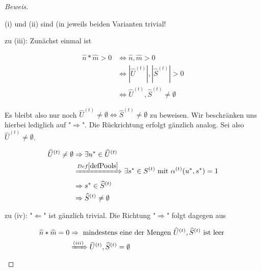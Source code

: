 \begin{proof}[Beweis] \textrm{ }

\vspace{0.3cm}

(i) und (ii) sind (in jeweils beiden Varianten trivial!

\vspace{0.3cm}

zu (iii): Zunächst einmal ist

\begin{align*}
\widehat{n} * \widehat{m} > 0 &\Leftrightarrow \widehat{n}, \widehat{m} > 0 \\
&\Leftrightarrow |\widehat{U}^{(t)}|, |\widehat{S}^{(t)}| > 0 \\
&\Leftrightarrow \widehat{U}^{(t)}, \widehat{S}^{(t)} \neq \emptyset
\end{align*}

\vspace{0.3cm}

Es bleibt also nur noch $\widehat{U}^{(t)} \neq \emptyset \Leftrightarrow \widehat{S}^{(t)} \neq \emptyset$ zu beweisen. Wir beschränken uns hierbei lediglich auf "$\Rightarrow$". Die Rückrichtung erfolgt gänzlich analog. Sei also $\widehat{U}^{(t)} \neq \emptyset$.

\begin{align*}
\widehat{U}^{(t)} \neq \emptyset &\Rightarrow \exists u^{*} \in \widehat{U}^{(t)} \\
&\xRightarrow{Def \ref{defPools}} \exists s^{*} \in S^{(t)} \textrm{ mit } \alpha^{(t)}(u^{*}, s^{*}) = 1 \\
&\Rightarrow s^{*} \in \widehat{S}^{(t)} \\
&\Rightarrow \widehat{S}^{(t)} \neq \emptyset
\end{align*}

\vspace{0.3cm}

zu (iv): 
"$\Leftarrow$" ist gänzlich trivial. Die Richtung "$\Rightarrow$" folgt dagegen aus

\begin{align*}
\widehat{n} * \widehat{m} = 0 &\Rightarrow \textrm{ mindestens eine der Mengen } \widehat{U}^{(t)}, \widehat{S}^{(t)} \textrm{ ist leer } \\
&\xRightarrow{(iii)}  \widehat{U}^{(t)}, \widehat{S}^{(t)} = \emptyset
\end{align*}
  
\end{proof}

